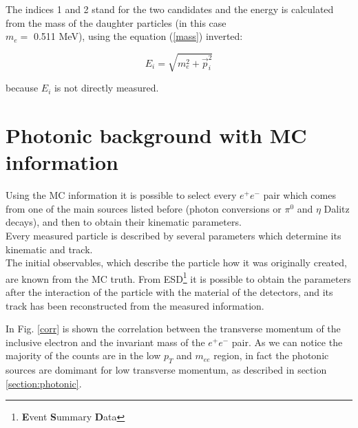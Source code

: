 \documentclass[a4paper,twocolumn,gsifonts,twoside]{gsipaper}
\begin{document}
The indices 1 and 2 stand for the two candidates and the energy is calculated from the mass of the daughter particles (in this case
\\$m_{e} =$ 0.511 MeV), using the equation (\ref{mass}) inverted:

\begin{equation}
 E_{i} = \sqrt{m_{e}^{2}+\vec{p}_{i}^{2}}
 \label{energy}
\end{equation}

\vspace{0.3cm}
because $E_{i}$ is not directly measured.

\section{Photonic background with MC information}
Using the MC information it is possible to select every $e^{+}e^{-}$ pair which comes from one of the main sources listed before
(photon conversions or $\pi^{0}$ and $\eta$ Dalitz decays), and then to obtain their kinematic parameters.\\ 

Every measured particle is described by several parameters which determine its kinematic and track.\\
The initial observables, which describe the particle how it was originally created, are known from the MC truth.
From ESD\footnote{\textbf{E}vent \textbf{S}ummary \textbf{D}ata} it is possible to obtain the parameters after the interaction
of the particle with the material of the detectors,  and its track has been reconstructed from the measured information. 

In Fig. \ref{corr} is shown the correlation between the transverse momentum of the inclusive electron and the 
invariant mass of the $e^{+}e^{-}$ pair. As we can notice the majority of the counts are in the low $p_{T}$ and $m_{ee}$ region, in fact 
the photonic sources are domimant for low transverse momentum, as described in section \ref{section:photonic}.
\end{document}
